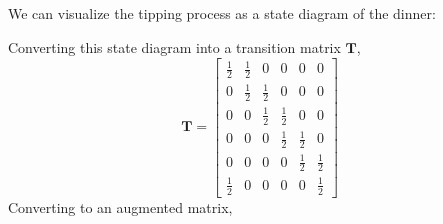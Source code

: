 \documentclass[]{article}
\begin{document}
\subsection{}\label{sec:1-a}

We can visualize the tipping process as a state diagram of the dinner:
\begin{center}
\end{center}
Converting this state diagram into a transition matrix \(\mathbf{T}\), 
\begin{equation}
	\mathbf{T} = 
	\begin{bmatrix}
	\frac{1}{2} & \frac{1}{2} & 0 & 0 & 0 & 0 \\
	0 & \frac{1}{2} & \frac{1}{2} & 0 & 0 & 0 \\
	0 & 0 & \frac{1}{2} & \frac{1}{2} & 0 & 0 \\
	0 & 0 & 0 & \frac{1}{2} & \frac{1}{2} & 0 \\
	0 & 0 & 0 & 0 & \frac{1}{2} & \frac{1}{2} \\
	\frac{1}{2} & 0 & 0 & 0 & 0 & \frac{1}{2}
	\end{bmatrix}
\end{equation}
Converting to an augmented matrix, 
\end{document}
